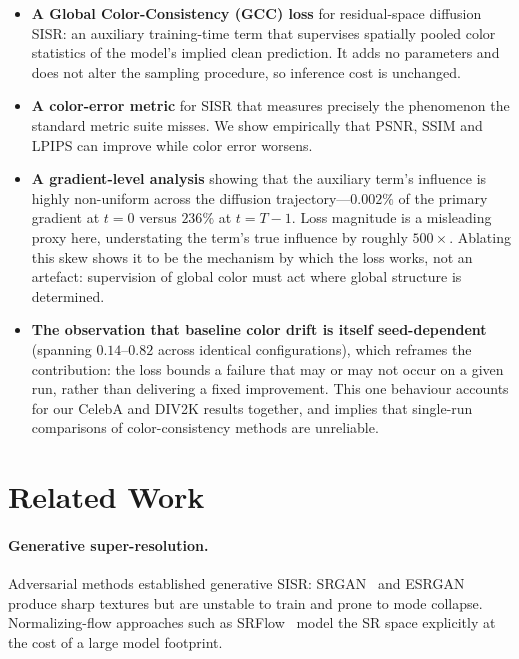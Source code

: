 \documentclass[11pt]{article}
\begin{document}
\begin{itemize}
\item \textbf{A Global Color-Consistency (GCC) loss} for residual-space diffusion
SISR: an auxiliary training-time term that supervises spatially pooled color
statistics of the model's implied clean prediction. It adds no parameters and
does not alter the sampling procedure, so inference cost is unchanged.

\item \textbf{A color-error metric} for SISR that measures precisely the
phenomenon the standard metric suite misses. We show empirically that PSNR, SSIM
and LPIPS can improve while color error worsens.

\item \textbf{A gradient-level analysis} showing that the auxiliary term's
influence is highly non-uniform across the diffusion trajectory---$0.002\%$ of
the primary gradient at $t{=}0$ versus $236\%$ at $t{=}T{-}1$. Loss magnitude is
a misleading proxy here, understating the term's true influence by roughly
$500\times$. Ablating this skew shows it to be the mechanism by which the loss
works, not an artefact: supervision of global color must act where global
structure is determined.

\item \textbf{The observation that baseline color drift is itself seed-dependent}
(spanning $0.14$--$0.82$ across identical configurations), which reframes the
contribution: the loss bounds a failure that may or may not occur on a given run,
rather than delivering a fixed improvement. This one behaviour accounts for our
CelebA and DIV2K results together, and implies that single-run comparisons of
color-consistency methods are unreliable.
\end{itemize}

\section{Related Work}

\paragraph{Generative super-resolution.}
Adversarial methods established generative SISR: SRGAN~\cite{ledig2017photo} and
ESRGAN~\cite{wang2018esrgan} produce sharp textures but are unstable to train and
prone to mode collapse. Normalizing-flow approaches such as
SRFlow~\cite{lugmayr2020srflow} model the SR space explicitly at the cost of a
large model footprint.
\end{document}
